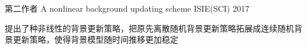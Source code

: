 


\begin{cventries}


\cventry
{第二作者} %
{A nonlinear background updating scheme} %
{ISIE(SCI)} %
{2017} %
{ %
\begin{cvitems}
\item {提出了种非线性的背景更新策略，把原先离散随机背景更新策略拓展成连续随机背景更新策略，使得背景模型随时间推移更加稳定}
\end{cvitems}
}


\end{cventries}